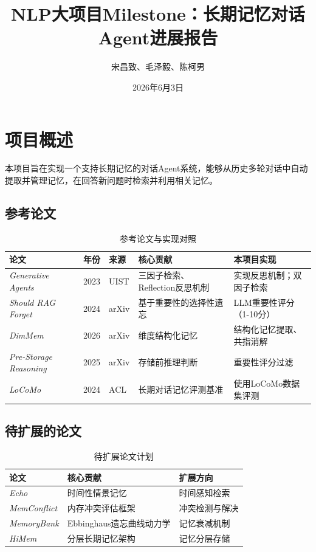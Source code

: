 \documentclass[11pt]{article}
\title{\textbf{NLP大项目Milestone：长期记忆对话Agent进展报告}}
\author{宋昌致、毛泽毅、陈柯男}
\date{2026年6月3日}
\begin{document}
\maketitle

\section{项目概述}

本项目旨在实现一个支持长期记忆的对话Agent系统，能够从历史多轮对话中自动提取并管理记忆，在回答新问题时检索并利用相关记忆。

\subsection{参考论文}

\begin{table}[H]
    \centering
    \begin{tabular}{|l|l|l|l|l|}
        \hline
        论文 & 年份 & 来源 & 核心贡献 & 本项目实现 \\
        \hline
        \textit{Generative Agents} & 2023 & UIST & 三因子检索、Reflection反思机制 & 实现反思机制；双因子检索 \\
        \hline
        \textit{Should RAG Forget} & 2024 & arXiv & 基于重要性的选择性遗忘 & LLM重要性评分（1-10分） \\
        \hline
        \textit{DimMem} & 2026 & arXiv & 维度结构化记忆 & 结构化记忆提取、共指消解 \\
        \hline
        \textit{Pre-Storage Reasoning} & 2025 & arXiv & 存储前推理判断 & 重要性评分过滤 \\
        \hline
        \textit{LoCoMo} & 2024 & ACL & 长期对话记忆评测基准 & 使用LoCoMo数据集评测 \\
        \hline
    \end{tabular}
    \caption{参考论文与实现对照}
\end{table}

\subsection{待扩展的论文}

\begin{table}[H]
    \centering
    \begin{tabular}{|l|l|l|}
        \hline
        论文 & 核心贡献 & 扩展方向 \\
        \hline
        \textit{Echo} & 时间性情景记忆 & 时间感知检索 \\
        \hline
        \textit{MemConflict} & 内存冲突评估框架 & 冲突检测与解决 \\
        \hline
        \textit{MemoryBank} & Ebbinghaus遗忘曲线动力学 & 记忆衰减机制 \\
        \hline
        \textit{HiMem} & 分层长期记忆架构 & 记忆分层存储 \\
        \hline
    \end{tabular}
    \caption{待扩展论文计划}
\end{table}
\end{document}
